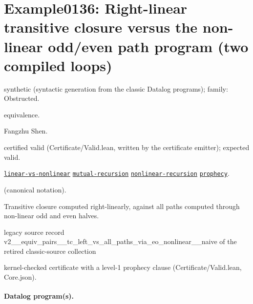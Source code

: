 \documentclass[10pt]{article}
\begin{document}
\Needspace{0.45\textheight}

\section{Example0136: Right-linear transitive closure versus the non-linear odd/even path program (two compiled loops)}\label{case:Example0136}

\begin{description}[leftmargin=2.6cm,style=nextline,itemsep=1pt]

\item[Category] synthetic (syntactic generation from the classic Datalog programs); family: Obstructed.

\item[Kind] equivalence.

\item[Contributors] Fangzhu Shen.

\item[Status] certified valid (Certificate/Valid.lean, written by the certificate emitter); expected valid.

\item[Tags] \hyperref[tag:linear-vs-nonlinear]{\texttt{linear-vs-nonlinear}} \hyperref[tag:mutual-recursion]{\texttt{mutual-recursion}} \hyperref[tag:nonlinear-recursion]{\texttt{nonlinear-recursion}} \hyperref[tag:prophecy]{\texttt{prophecy}}.

\item[Input]  (canonical notation).

\item[Summary] Transitive closure computed right-linearly, against all paths computed through non-linear odd and even halves.

\item[Sources] {\raggedright legacy source record v2\_\_equiv\_pairs\_\_tc\_left\_vs\_all\_paths\_via\_eo\_nonlinear\_\_naive of the retired classic-source collection\par}

\item[Prophecy] kernel-checked certificate with a level-1 prophecy clause (Certificate/Valid.lean, Core.json).

\end{description}

\paragraph{Datalog program(s).}
\end{document}
